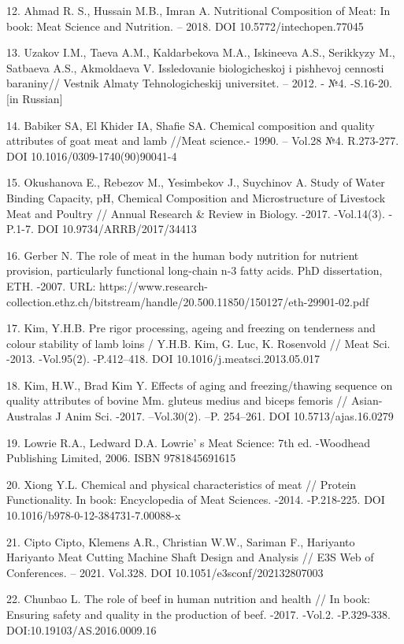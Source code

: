 \begin{references}
12. Ahmad R. S., Hussain M.B., Imran A. Nutritional Composition of Meat:
In book: Meat Science and Nutrition. -- 2018. DOI
10.5772/intechopen.77045

13. Uzakov I.M., Taeva A.M., Kaldarbekova M.A., Iskineeva A.S.,
Serikkyzy M., Satbaeva A.S., Akmoldaeva V. Issledovanie biologicheskoj i
pishhevoj cennosti baraniny// Vestnik Almaty Tehnologicheskij
universitet. -- 2012. - №4. -S.16-20. {[}in Russian{]}

14. Babiker SA, El Khider IA, Shafie SA. Chemical composition and
quality attributes of goat meat and lamb //Meat science.- 1990. --
Vol.28 №4. R.273-277. DOI 10.1016/0309-1740(90)90041-4

15. Okushanova E., Rebezov M., Yesimbekov J., Suychinov A. Study of
Water Binding Capacity, pH, Chemical Composition and Microstructure of
Livestock Meat and Poultry // Annual Research \& Review in Biology.
-2017. -Vol.14(3). -P.1-7. DOI 10.9734/ARRB/2017/34413

16. Gerber N. The role of meat in the human body nutrition for nutrient
provision, particularly functional long-chain n-3 fatty acids. PhD
dissertation, ETH. -2007. URL:
https://www.research-collection.ethz.ch/bitstream/handle/20.500.11850/150127/eth-29901-02.pdf

17. Kim, Y.H.B. Pre rigor processing, ageing and freezing on tenderness
and colour stability of lamb loins / Y.H.B. Kim, G. Luc, K. Rosenvold //
Meat Sci. -2013. -Vol.95(2). -P.412--418. DOI
10.1016/j.meatsci.2013.05.017

18. Kim, H.W., Brad Kim Y. Effects of aging and freezing/thawing
sequence on quality attributes of bovine Mm. gluteus medius and biceps
femoris // Asian-Australas J Anim Sci. -2017. --Vol.30(2). --P.
254--261. DOI 10.5713/ajas.16.0279

19. Lowrie R.A., Ledward D.A. Lowrie' s Meat Science: 7th
ed. -Woodhead Publishing Limited, 2006. ISBN 9781845691615

20. Xiong Y.L. Chemical and physical characteristics of meat // Protein
Functionality. In book: Encyclopedia of Meat Sciences. -2014.
-P.218-225. DOI 10.1016/b978-0-12-384731-7.00088-x

21. Cipto Cipto, Klemens A.R., Christian W.W., Sariman F., Hariyanto
Hariyanto Meat Cutting Machine Shaft Design and Analysis // E3S Web of
Conferences. -- 2021. Vol.328. DOI 10.1051/e3sconf/202132807003

22. Chunbao L. The role of beef in human nutrition and health // In
book: Ensuring safety and quality in the production of beef. -2017.
-Vol.2. -P.329-338. DOI:10.19103/AS.2016.0009.16


\end{references}
